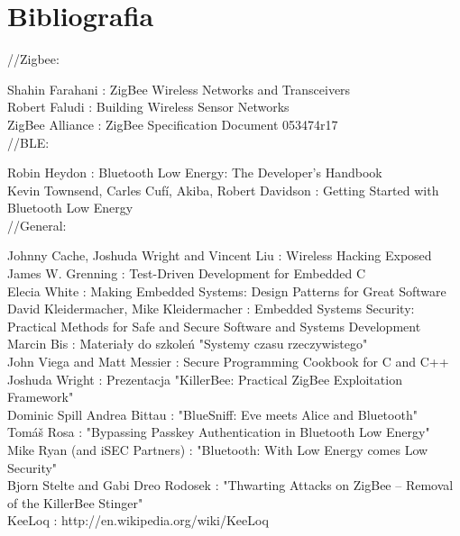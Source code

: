 \clearpage

\section{Bibliografia}

//Zigbee: 

Shahin Farahani : ZigBee Wireless Networks and Transceivers \\ 

Robert Faludi : Building Wireless Sensor Networks \\

ZigBee Alliance : ZigBee Specification Document 053474r17 \\

//BLE:

Robin Heydon : Bluetooth Low Energy: The Developer's Handbook \\

Kevin Townsend, Carles Cufí, Akiba, Robert Davidson : Getting Started with Bluetooth Low Energy \\

//General:

Johnny Cache, Joshuda Wright and Vincent Liu : Wireless Hacking Exposed \\

James W. Grenning : Test-Driven Development for Embedded C \\

Elecia White : Making Embedded Systems: Design Patterns for Great Software \\
	
David Kleidermacher, Mike Kleidermacher : Embedded Systems Security: Practical Methods for Safe and Secure Software and Systems Development \\

Marcin Bis : Materiały do szkoleń "Systemy czasu rzeczywistego" \\

John Viega and Matt Messier : Secure Programming Cookbook for C and C++ \\

Joshuda Wright : Prezentacja "KillerBee: Practical ZigBee Exploitation Framework" \\

Dominic Spill Andrea Bittau : "BlueSniff: Eve meets Alice and Bluetooth" \\

Tomáš Rosa : "Bypassing Passkey Authentication in Bluetooth Low Energy" \\

Mike Ryan (and iSEC Partners) : "Bluetooth: With Low Energy comes Low Security" \\

Bjorn Stelte and Gabi Dreo Rodosek : "Thwarting Attacks on ZigBee – Removal of the KillerBee Stinger" \\

KeeLoq : http://en.wikipedia.org/wiki/KeeLoq
\clearpage